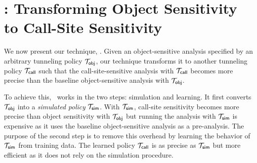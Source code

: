 
%


\section{\ourtechnique: Transforming Object Sensitivity to Call-Site Sensitivity}\label{sec:technique}
We now present our technique, \ourtechnique. 
Given an object-sensitive analysis specified by an arbitrary
tunneling policy $\mathcal{T}_{{\sf obj}}$, our technique transforms it to another
tunneling policy $\mathcal{T}_{{\sf call}}$
such that the
call-site-sensitive analysis with $\mathcal{T}_{{\sf call}}$ becomes more precise
than the baseline object-sensitive analysis with $\mathcal{T}_{{\sf obj}}$. 

To achieve this, \ourtechnique~works in the two steps: simulation and learning. 
It first converts $\mathcal{T}_{{\sf obj}}$ into
a {\em simulated policy} $\mathcal{T}_{{\sf sim}}$. 
With $\mathcal{T}_{{\sf sim}}$, call-site sensitivity becomes
more precise than object sensitivity with $\mathcal{T}_{{\sf obj}}$
but running the analysis with $\mathcal{T}_{{\sf sim}}$
is expensive as it uses the baseline
object-sensitive analysis as a pre-analysis. 
The purpose of the second step is to  remove this overhead
 by learning the behavior of $\mathcal{T}_{{\sf sim}}$ from training data.  
The learned policy $\mathcal{T}_{{\sf call}}$ is as precise as
$\mathcal{T}_{{\sf sim}}$ but more efficient as it does not rely on the
simulation procedure. 






